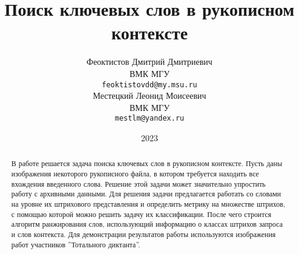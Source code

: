 \documentclass{article}
\title{Поиск ключевых слов в рукописном контексте}
\author{ Феоктистов Дмитрий Дмитриевич \\
	ВМК МГУ\\
	\texttt{feoktistovdd@my.msu.ru} \\
	\And
	Местецкий Леонид Моисеевич \\
	ВМК МГУ\\
	\texttt{mestlm@yandex.ru} \\
}
\date{2023}
\begin{document}
\maketitle

\begin{abstract}
	В работе решается задача поиска ключевых слов в рукописном контексте. Пусть даны изображения некоторого рукописного файла, в котором требуется находить все вхождения введенного слова. Решение этой задачи может значительно упростить работу с архивными данными. Для решения задачи предлагается работать со словами на уровне их штрихового представления и определить метрику на множестве штрихов, с помощью которой можно решить задачу их классификации. После чего строится алгоритм ранжирования слов, использующий информацию о классах штрихов запроса и слов контекста. Для демонстрации результатов работы используются изображения работ участников ''Тотального диктанта''.
\end{abstract}


\end{document}
